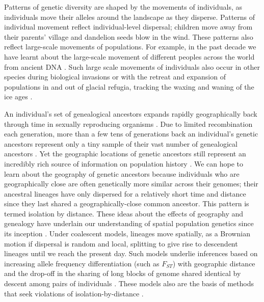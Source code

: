 \documentclass[12pt]{article}
\begin{document}
Patterns of genetic diversity are shaped by the movements of individuals, as individuals move their alleles around the landscape as they disperse. Patterns of individual movement reflect individual-level dispersal; children move away from their parents' village and dandelion seeds blow in the wind. These patterns also reflect large-scale movements of populations. For example, in the past decade we have learnt about the large-scale movement of different peoples across the world from ancient DNA \citep{slatkin2016ancient,reich2018we}. Such large scale movements of individuals also occur in other species during biological invasions or with the retreat and expansion of populations in and out of glacial refugia, tracking the waxing and waning of the ice ages \citep{hewitt2000genetic}.

An individual's set of genealogical ancestors expands rapidly geographically back through time in sexually reproducing organisms \citep{KELLEHER20161,Coop_where_genetic}. Due to limited recombination each generation, more than a few tens of generations back an individual's genetic ancestors represent only a tiny sample of their vast number of genealogical ancestors \citep{donnelly1983probability,Coop_many_genetic}. Yet the geographic locations of genetic ancestors still represent an incredibly rich source of information on population history \citep{bradburd2019spatial}. We can hope to learn about the geography of genetic ancestors because individuals who are geographically close are often genetically more similar across their genomes; their ancestral lineages have only dispersed for a relatively short time and distance since they last shared a geographically-close common ancestor. This pattern is termed isolation by distance. These ideas about the effects of geography and genealogy have underlain our understanding of spatial population genetics since its inception  \citep{wright1943isolation,malecot1948mathematics}. Under coalescent models, lineages move spatially, as a Brownian motion if dispersal is random and local, splitting to give rise to descendent lineages until we reach the present day. Such models underlie inferences based on increasing allele frequency differentiation (such as $F_{ST}$) with geographic distance \citep{rousset1997genetic} and the drop-off in the sharing of long blocks of genome shared identical by descent among pairs of individuals \citep{ralph2013geography,ringbauer2017inferring}. These models also are the basis of methods that seek violations of isolation-by-distance \citep{wang2014isolation}.
\end{document}
